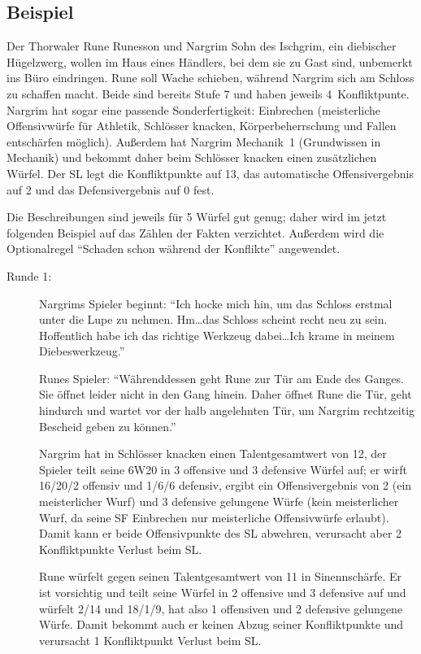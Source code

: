 \subsection{Beispiel}
\begin{beispiel}
Der Thorwaler Rune Runesson und Nargrim Sohn des Ischgrim, ein diebischer Hügelzwerg, wollen im Haus eines Händlers, bei dem sie zu Gast sind, unbemerkt ins Büro eindringen. Rune soll Wache schieben, während Nargrim sich am Schloss zu schaffen macht. Beide sind bereits Stufe 7 und haben jeweils 4~Konfliktpunte. Nargrim hat sogar eine passende Sonderfertigkeit: Einbrechen (meisterliche Offensivwürfe für Athletik, Schlösser knacken, Körperbeherrschung und Fallen entschärfen möglich). Außerdem hat Nargrim Mechanik~1 (Grundwissen in Mechanik) und bekommt daher beim Schlösser knacken einen zusätzlichen Würfel. Der SL legt die Konfliktpunkte auf 13, das automatische Offensivergebnis auf 2 und das Defensivergebnis auf 0 fest.

Die Beschreibungen sind jeweils für 5 Würfel gut genug; daher wird im jetzt folgenden Beispiel auf das Zählen der Fakten verzichtet. Außerdem wird die Optionalregel ``Schaden schon während der Konflikte'' angewendet.

\begin{description}
\item[Runde 1:]
Nargrims Spieler beginnt: ``Ich hocke mich hin, um das Schloss erstmal unter die Lupe zu nehmen. Hm\dots das Schloss scheint recht neu zu sein. Hoffentlich habe ich das richtige Werkzeug dabei\dots Ich krame in meinem Diebeswerkzeug.''

Runes Spieler: ``Währenddessen geht Rune zur Tür am Ende des Ganges. Sie öffnet leider nicht in den Gang hinein. Daher öffnet Rune die Tür, geht hindurch und wartet vor der halb angelehnten Tür, um Nargrim rechtzeitig Bescheid geben zu können.''

Nargrim hat in Schlösser knacken einen Talentgesamtwert von 12, der Spieler teilt seine 6W20 in 3 offensive und 3 defensive Würfel auf; er wirft 16/20/2 offensiv und 1/6/6 defensiv, ergibt ein Offensivergebnis von 2 (ein meisterlicher Wurf) und 3 defensive gelungene Würfe (kein meisterlicher Wurf, da seine SF Einbrechen nur meisterliche Offensivwürfe erlaubt). Damit kann er beide Offensivpunkte des SL abwehren, verursacht aber 2 Konfliktpunkte Verlust beim SL.

Rune würfelt gegen seinen Talentgesamtwert von 11 in Sinennschärfe. Er ist vorsichtig und teilt seine Würfel in 2 offensive und 3 defensive auf und würfelt 2/14 und 18/1/9, hat also 1 offensiven und 2 defensive gelungene Würfe. Damit bekommt auch er keinen Abzug seiner Konfliktpunkte und verursacht 1 Konfliktpunkt Verlust beim SL.


\end{description}
\end{beispiel}
